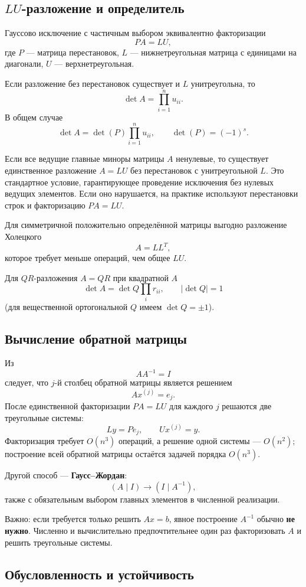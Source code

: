 \subsection[LU-разложение и определитель]{$LU$-разложение и определитель}

Гауссово исключение с частичным выбором эквивалентно факторизации
\[
\boxed{PA=LU},
\]
где $P$ --- матрица перестановок, $L$ --- нижнетреугольная матрица с единицами на диагонали, $U$ --- верхнетреугольная.

Если разложение без перестановок существует и $L$ унитреугольна, то
\[
\det A=\prod_{i=1}^{n}u_{ii}.
\]
В общем случае
\[
\boxed{\det A=\det(P)\prod_{i=1}^{n}u_{ii}},
\qquad \det(P)=(-1)^s.
\]

Если все ведущие главные миноры матрицы $A$ ненулевые, то существует единственное разложение $A=LU$ без перестановок с унитреугольной $L$. Это стандартное условие, гарантирующее проведение исключения без нулевых ведущих элементов. Если оно нарушается, на практике используют перестановки строк и факторизацию $PA=LU$.

Для симметричной положительно определённой матрицы выгодно разложение Холецкого
\[
A=LL^T,
\]
которое требует меньше операций, чем общее $LU$.

Для $QR$-разложения $A=QR$ при квадратной $A$
\[
\det A=\det Q\prod_i r_{ii},
\qquad |\det Q|=1
\]
(для вещественной ортогональной $Q$ имеем $\det Q=\pm1$).

\subsection{Вычисление обратной матрицы}

Из
\[
AA^{-1}=I
\]
следует, что $j$-й столбец обратной матрицы является решением
\[
Ax^{(j)}=e_j.
\]
После единственной факторизации $PA=LU$ для каждого $j$ решаются две треугольные системы:
\[
Ly=Pe_j,
\qquad
Ux^{(j)}=y.
\]
Факторизация требует $O(n^3)$ операций, а решение одной системы --- $O(n^2)$; построение всей обратной матрицы остаётся задачей порядка $O(n^3)$.

Другой способ --- \textbf{Гаусс--Жордан}:
\[
(A\mid I)\longrightarrow(I\mid A^{-1}),
\]
также с обязательным выбором главных элементов в численной реализации.

Важно: если требуется только решить $Ax=b$, явное построение $A^{-1}$ обычно \textbf{не нужно}. Численно и вычислительно предпочтительнее один раз факторизовать $A$ и решить треугольные системы.

\subsection{Обусловленность и устойчивость}

